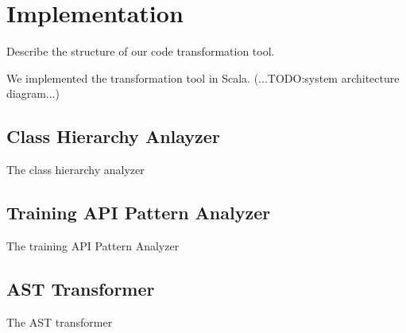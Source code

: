 \section{Implementation}\label{sec:impl}
Describe the structure of our code transformation tool.

We implemented the transformation tool in Scala.  
(...TODO:system architecture diagram...)

\subsection{Class Hierarchy Anlayzer}

The class hierarchy analyzer

\subsection{Training API Pattern Analyzer}

The training API Pattern Analyzer

\subsection{AST Transformer}

The AST transformer
